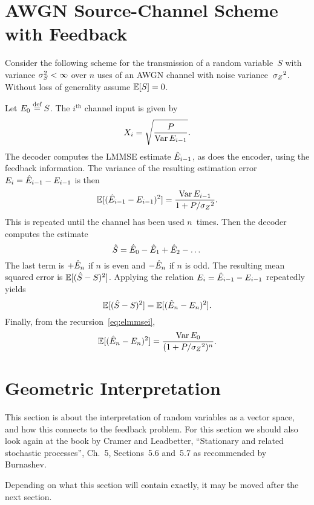 \section{AWGN Source-Channel Scheme with Feedback}

Consider the following scheme for the transmission of a random variable~$S$ with
variance ${\sigma_S^2} < \infty$ over $n$ uses of an AWGN channel with noise
variance~${{\sigma_Z}^2}$. Without loss of generality assume $\mathbb{E}[S] = 0$. 

Let $E_0 \stackrel{\text{def}}{=} S$. The $i^{\text{th}}$ channel input is given by
\begin{equation*}
  X_i = \sqrt{\frac{P}{\operatorname{Var} E_{i-1}}}.
\end{equation*}
The decoder computes the LMMSE estimate $\hat{E}_{i-1}$, as does the encoder, using
the feedback information. The variance of the resulting estimation error $E_i =
\hat{E}_{i-1} - E_{i-1}$ is then
\begin{equation}
  \label{eq:elmmsei}
  \mathbb{E}[(\hat{E}_{i-1} - E_{i-1})^2] = \frac{\operatorname{Var} E_{i-1}}{1 + P/{{\sigma_Z}^2}}.
\end{equation}
This is repeated until the channel has been used $n$~times. Then the decoder
computes the estimate
\begin{equation*}
  {\hat{S}} = \hat{E}_0 - \hat{E}_1 + \hat{E}_2 - \dots
\end{equation*}
The last term is $+\hat{E}_n$ if $n$ is even and $-\hat{E}_n$ if $n$ is odd. The
resulting mean squared error is $\mathbb{E}[({\hat{S}} - S)^2]$.  Applying the relation $E_i =
\hat{E}_{i-1} - E_{i-1}$ repeatedly yields
\begin{equation*}
  \mathbb{E}[({\hat{S}} - S)^2] = \mathbb{E}[(\hat{E}_n - E_n)^2].
\end{equation*}
Finally, from the recursion~\eqref{eq:elmmsei}, 
\begin{equation*}
  \mathbb{E}[(\hat{E}_n - E_n)^2] = \frac{\operatorname{Var} E_0}{(1 + P/{{\sigma_Z}^2})^n}.
\end{equation*}


\section{Geometric Interpretation}

This section is about the interpretation of random variables as a vector space,
and how this connects to the feedback problem. For this section we should also
look again at the book by Cramer and Leadbetter, ``Stationary and related
stochastic processes'', Ch.~5, Sections~5.6 and~5.7 as recommended by Burnashev.

Depending on what this section will contain exactly, it may be moved after the
next section.


